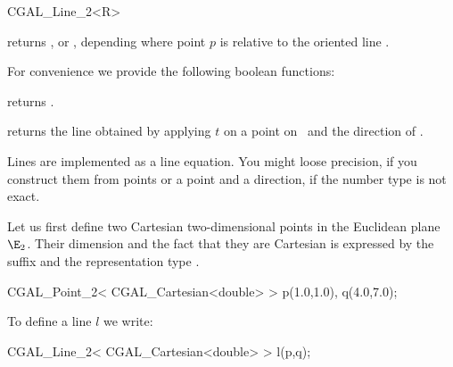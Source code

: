 \begin {classtemplate} {CGAL_Line_2<R>}
       {}

       {}

       {returns , 
	 or ,
        depending where point $p$ is relative to the oriented line \var.
        }


For convenience we provide the following boolean functions:

       {}

       {returns .}

       {}

       {}

       {returns the line obtained by applying $t$ on a point on \var\ 
        and the direction of \var.}


\implementation

Lines are implemented as a line equation. You might loose precision,
if you construct them from points or a point and a direction, if the
number type is not exact.

\example
Let us first define two Cartesian two-dimensional points in the Euclidean 
plane $\E_2$. Their
dimension and the fact that they are Cartesian is expressed by
the suffix  and the representation type .

\begin{cprog}

  CGAL_Point_2< CGAL_Cartesian<double> >  p(1.0,1.0), q(4.0,7.0);
\end{cprog} 

To define a line $l$ we write:

\begin{cprog}

  CGAL_Line_2< CGAL_Cartesian<double> > l(p,q);
\end{cprog} 


\end {classtemplate} 

%
%

